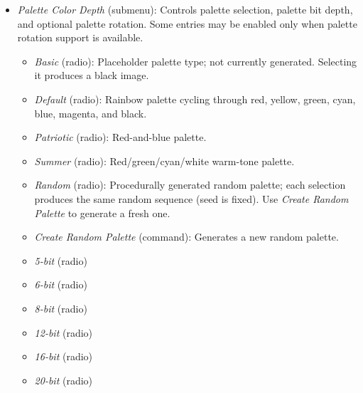 \begin{itemize}
\begin{itemize}
      \item \emph{GPU-Accelerated (see README)} (radio): Selects the
      GPU-accelerated perturbation path, which offloads high-precision
      reference-orbit computation to the GPU via the 
      pipeline.  This option is a mode selection (radio button), not a one-shot
      action.  Intended for extremely deep zooms where CPU-based reference
      computation is prohibitively slow; may be slower than CPU at modest
      precision levels.  See \cref{subsec:ref-orbit-gpu} for details.

      \item \emph{Clear and Reload Reference Orbits} (command): Clears reference-orbit state and reloads it from persistent storage.
      \item \emph{Save Reference Orbits} (command): Saves reference-orbit state to persistent storage.
    \end{itemize}

  \item \emph{Palette Color Depth} (submenu): Controls palette selection,
    palette bit depth, and optional palette rotation.  Some entries may be
    enabled only when palette rotation support is available.
    \begin{itemize}
      \item \emph{Basic} (radio): Placeholder palette type; not currently
      generated.  Selecting it produces a black image.
      \item \emph{Default} (radio): Rainbow palette cycling through
      red, yellow, green, cyan, blue, magenta, and black.
      \item \emph{Patriotic} (radio): Red-and-blue palette.
      \item \emph{Summer} (radio): Red/green/cyan/white warm-tone palette.
      \item \emph{Random} (radio): Procedurally generated random palette;
      each selection produces the same random sequence (seed is fixed).
      Use \emph{Create Random Palette} to generate a fresh one.

      \item \emph{Create Random Palette} (command): Generates a new random palette.

      \item \emph{5-bit} (radio)
      \item \emph{6-bit} (radio)
      \item \emph{8-bit} (radio)
      \item \emph{12-bit} (radio)
      \item \emph{16-bit} (radio)
      \item \emph{20-bit} (radio)


\end{itemize}
\end{itemize}
